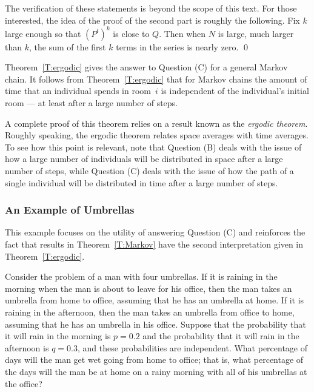The verification of these statements is beyond the scope of this text.
For those interested, the idea of the proof of the second part is roughly the
following.  Fix $k$ large enough so that $(P^t)^k$ is close to $Q$.  Then when
$N$ is large, much larger than $k$, the sum of the first $k$ terms in the
series is nearly zero.  \qed


Theorem~\ref{T:ergodic} gives the answer to Question (C) for a general Markov
chain.  It follows from Theorem~\ref{T:ergodic} that for Markov chains the
amount of time that an individual spends in room~$i$ is independent of the
individual's initial room --- at least after a large number of steps.

A complete proof of this theorem relies on a result known as the {\em ergodic
theorem}.
Roughly speaking, the ergodic theorem relates space averages
with time averages.   To see how this point is relevant, note that Question (B)
deals with the issue of how a large number of individuals will be distributed
in space after a large number of steps, while Question (C) deals with the
issue of how the path of a single individual will be distributed in time after
a large number of steps.

\subsubsection*{An Example of Umbrellas}

This example focuses on the utility of answering Question (C) and reinforces
the fact that results in Theorem~\ref{T:Markov} have the second
interpretation given in Theorem~\ref{T:ergodic}.

Consider the problem of a man with four umbrellas.  If it is raining in the
morning when the man is about to leave for his office, then the man takes an
umbrella from home to office, assuming that he has an umbrella at home.  If it
is raining in the afternoon, then the man takes an umbrella from office to
home, assuming that he has an umbrella in his office.  Suppose that the
probability that it will rain in the morning is $p=0.2$ and the probability
that it will rain in the afternoon is $q=0.3$, and these probabilities are
independent.  What percentage of days will the man get wet going from home
to office; that is, what percentage of the days will the man be at home on a
rainy morning with all of his umbrellas at the office?

